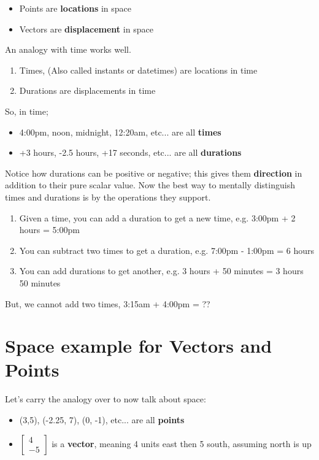 \documentclass{article}
\begin{document}
\begin{itemize}
    \item Points are \textbf{locations} in space
    \item Vectors are \textbf{displacement} in space
\end{itemize}

An analogy with time works well.

\begin{enumerate}
    \item Times, (Also called instants or datetimes) are locations in time
    \item Durations are displacements in time
\end{enumerate}

So, in time;


\begin{itemize}
    \item 4:00pm, noon, midnight, 12:20am, etc... are all \textbf{times}
    \item +3 hours, -2.5 hours, +17 seconds, etc... are all \textbf{durations}
\end{itemize}

Notice how durations can be positive or negative; this gives them \textbf{direction} in addition to their pure scalar value. Now the best way to mentally distinguish times and durations is by the operations they support.

\begin{enumerate}
    \item Given a time, you can add a duration to get a new time, e.g. 3:00pm + 2 hours = 5:00pm
    \item You can subtract two times to get a duration, e.g. 7:00pm - 1:00pm = 6 hours
    \item You can add durations to get another, e.g. 3 hours + 50 minutes = 3 hours 50 minutes
\end{enumerate}

But, we cannot add two times, 3:15am + 4:00pm = ??

\section{Space example for Vectors and Points}

Let's carry the analogy over to now talk about space:

\begin{itemize}
    \item (3,5), (-2.25, 7), (0, -1), etc... are all \textbf{points}
    \item $\begin{bmatrix} 4 \\ -5 \end{bmatrix}$ is a \textbf{vector}, meaning 4 units east then 5 south, assuming north is up
\end{itemize}
\end{document}
